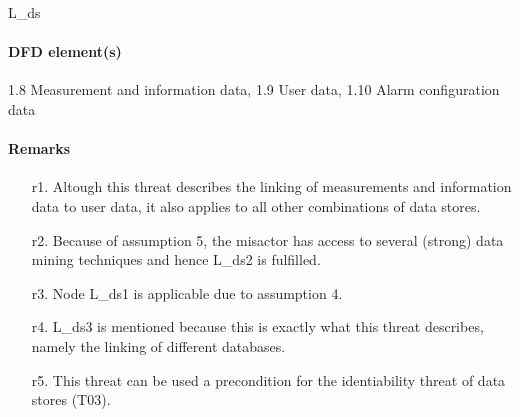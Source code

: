 L\_ds

\paragraph{DFD element(s)}

1.8 Measurement and information data, 1.9 User data, 1.10 Alarm configuration
data

\paragraph{Remarks}
	\begin{enumerate}
         \item[r1.] Altough this threat describes the linking of measurements
         and information data to user data, it also applies to all other
         combinations of data stores.
         \item[r2.] Because of assumption 5, the misactor has access to several
         (strong) data mining techniques and hence L\_ds2 is fulfilled.
         \item[r3.] Node L\_ds1 is applicable due to assumption 4.
         \item[r4.] L\_ds3 is mentioned because this is exactly what this threat
         describes, namely the linking of different databases.
         \item[r5.] This threat can be used a precondition for the identiability
         threat of data stores (T03).
    \end{enumerate}
